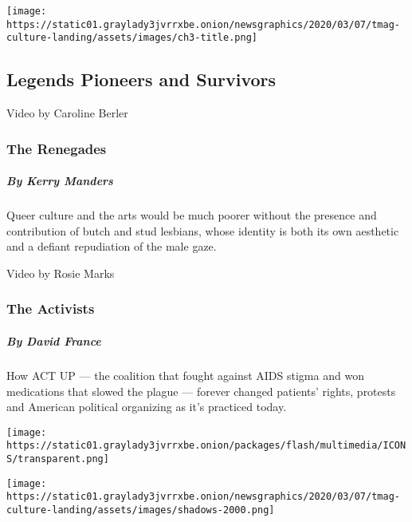 \texttt{[image: https://static01.graylady3jvrrxbe.onion/newsgraphics/2020/03/07/tmag-culture-landing/assets/images/ch3-title.png]}

\hypertarget{legends-pioneers-and-survivors}{%
\subsection{Legends Pioneers and
Survivors}\label{legends-pioneers-and-survivors}}

\href{https://www.nytimes3xbfgragh.onion/interactive/2020/04/13/t-magazine/butch-stud-lesbian.html}{}

Video by Caroline Berler

\hypertarget{the-renegades}{%
\subsubsection{The Renegades}\label{the-renegades}}

\hypertarget{by-kerry-manders}{%
\subparagraph{By Kerry Manders}\label{by-kerry-manders}}

Queer culture and the arts would be much poorer without the presence and
contribution of butch and stud lesbians, whose identity is both its own
aesthetic and a defiant repudiation of the male gaze.

\href{https://www.nytimes3xbfgragh.onion/interactive/2020/04/13/t-magazine/act-up-aids.html}{}

Video by Rosie Marks

\hypertarget{the-activists}{%
\subsubsection{The Activists}\label{the-activists}}

\hypertarget{by-david-france}{%
\subparagraph{By David France}\label{by-david-france}}

How ACT UP --- the coalition that fought against AIDS stigma and won
medications that slowed the plague --- forever changed patients' rights,
protests and American political organizing as it's practiced today.

\href{https://www.nytimes3xbfgragh.onion/interactive/2020/04/13/t-magazine/artist-recluse.html}{}

\texttt{[image: https://static01.graylady3jvrrxbe.onion/packages/flash/multimedia/ICONS/transparent.png]}

\texttt{[image: https://static01.graylady3jvrrxbe.onion/newsgraphics/2020/03/07/tmag-culture-landing/assets/images/shadows-2000.png]}

